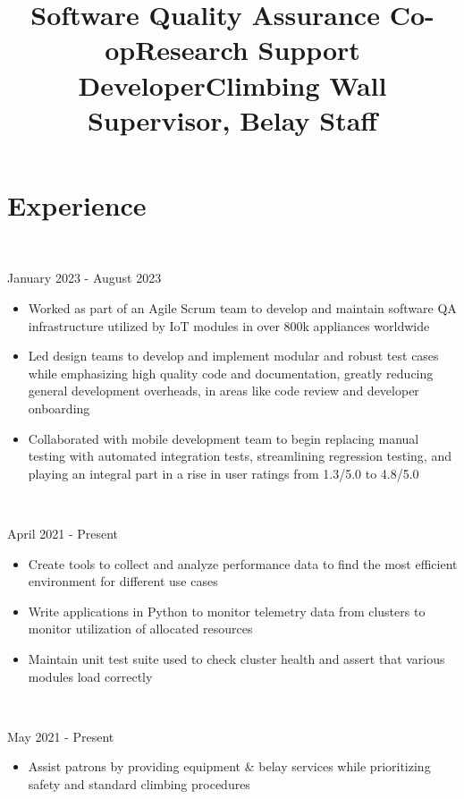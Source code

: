 \section{Experience}
\\
\title{Software Quality Assurance Co-op}{January 2023 - August 2023}
\begin{itemize}
    \item Worked as part of an Agile Scrum team to develop and maintain software QA infrastructure utilized by IoT modules in over 800k appliances worldwide
    \item Led design teams to develop and implement modular and robust test cases while emphasizing high quality code and documentation, greatly reducing general development overheads, in areas like code review and developer onboarding
    \item Collaborated with mobile development team to begin replacing manual testing with automated integration tests, streamlining regression testing, and playing an integral part in a rise in user ratings from 1.3/5.0 to 4.8/5.0
\end{itemize}
\\
\title{Research Support Developer}{April 2021 - Present}
\begin{itemize}
    \item Create tools to collect and analyze performance data to find the most efficient environment for different use cases
    \item Write applications in Python to monitor telemetry data from clusters to monitor utilization of allocated resources
    \item Maintain unit test suite used to check cluster health and assert that various modules load correctly
\end{itemize}
\\
\title{Climbing Wall Supervisor, Belay Staff}{May 2021 - Present}
\begin{itemize}
    \item Assist patrons by providing equipment \& belay services while prioritizing safety and standard climbing procedures
\end{itemize}